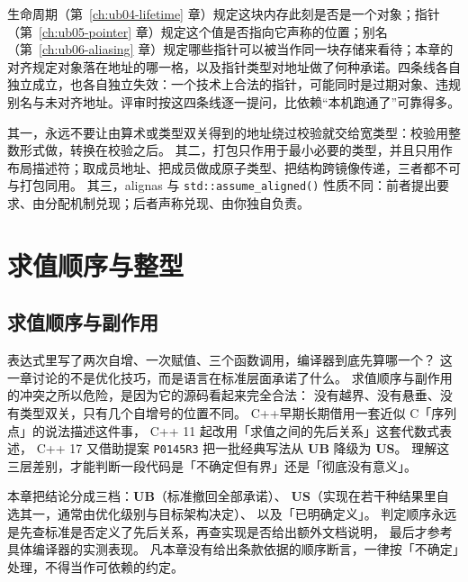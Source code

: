 \documentclass[12pt,a4paper,fontset=fandol]{ctexbook}
\newcommand{\Fn}[1]{\texttt{#1()}}
\newcommand{\Lang}[1]{\textsf{#1}}
\newcommand{\CL}{\Lang{C}}
\newcommand{\CPP}{\Lang{C++}}
\newcommand{\UB}{\textbf{\textsf{UB}}}
\newcommand{\USB}{\textbf{\textsf{US}}}
\newcommand{\Feat}[1]{\texttt{#1}}
\begin{document}
\begin{note}[title={本章在内存与对象四条契约线中的位置}]
生命周期（第~\ref{ch:ub04-lifetime} 章）规定这块内存此刻是否是一个对象；指针（第~\ref{ch:ub05-pointer} 章）规定这个值是否指向它声称的位置；别名（第~\ref{ch:ub06-aliasing} 章）规定哪些指针可以被当作同一块存储来看待；本章的对齐规定对象落在地址的哪一格，以及指针类型对地址做了何种承诺。四条线各自独立成立，也各自独立失效：一个技术上合法的指针，可能同时是过期对象、违规别名与未对齐地址。评审时按这四条线逐一提问，比依赖“本机跑通了”可靠得多。
\end{note}

\begin{guideline}[title={对齐的三条底线}]
其一，永远不要让由算术或类型双关得到的地址绕过校验就交给宽类型：校验用整数形式做，转换在校验之后。
其二，打包只作用于最小必要的类型，并且只用作布局描述符；取成员地址、把成员做成原子类型、把结构跨镜像传递，三者都不可与打包同用。
其三，\Lang{alignas} 与 \Fn{std::assume\_aligned} 性质不同：前者提出要求、由分配机制兑现；后者声称兑现、由你独自负责。
\end{guideline}

\part{求值顺序与整型}

\chapter{求值顺序与副作用}\label{ch:ub08-evaluation}

表达式里写了两次自增、一次赋值、三个函数调用，编译器到底先算哪一个？
这一章讨论的不是优化技巧，而是语言在标准层面承诺了什么。
求值顺序与副作用的冲突之所以危险，是因为它的源码看起来完全合法：
没有越界、没有悬垂、没有类型双关，只有几个自增号的位置不同。
\CPP 早期长期借用一套近似 \CL「序列点」的说法描述这件事，
\CPP{} 11 起改用「求值之间的先后关系」这套代数式表述，
\CPP{} 17 又借助提案 \Feat{P0145R3} 把一批经典写法从 \UB{} 降级为 \USB{}。
理解这三层差别，才能判断一段代码是「不确定但有界」还是「彻底没有意义」。

\begin{note}[title={本章的判定口径}]
本章把结论分成三档：\UB{}（标准撤回全部承诺）、
\USB{}（实现在若干种结果里自选其一，通常由优化级别与目标架构决定）、
以及「已明确定义」。
判定顺序永远是先查标准是否定义了先后关系，再查实现是否给出额外文档说明，
最后才参考具体编译器的实测表现。
凡本章没有给出条款依据的顺序断言，一律按「不确定」处理，不得当作可依赖的约定。
\end{note}
\end{document}
